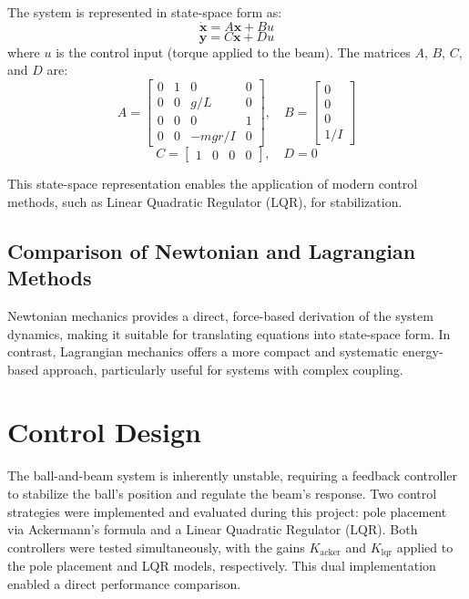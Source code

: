 \documentclass[conference]{IEEEtran}
\begin{document}
The system is represented in state-space form as:
\begin{equation}
\dot{\mathbf{x}} = A \mathbf{x} + B u
\end{equation}
\begin{equation}
\mathbf{y} = C \mathbf{x} + D u
\end{equation}
where \(u\) is the control input (torque applied to the beam). The matrices \(A\), \(B\), \(C\), and \(D\) are:
\[
A = \begin{bmatrix}
0 & 1 & 0 & 0 \\
0 & 0 & g/L & 0 \\
0 & 0 & 0 & 1 \\
0 & 0 & -m g r/I & 0
\end{bmatrix}, \quad
B = \begin{bmatrix}
0 \\ 0 \\ 0 \\ 1/I
\end{bmatrix}
\]
\[
C = \begin{bmatrix}
1 & 0 & 0 & 0
\end{bmatrix}, \quad
D = 0
\]

This state-space representation enables the application of modern control methods, such as Linear Quadratic Regulator (LQR), for stabilization.

\subsection{Comparison of Newtonian and Lagrangian Methods}
\label{subsec:model_comparison}
Newtonian mechanics provides a direct, force-based derivation of the system dynamics, making it suitable for translating equations into state-space form. In contrast, Lagrangian mechanics offers a more compact and systematic energy-based approach, particularly useful for systems with complex coupling.

\section{Control Design}
\label{sec:control_design}
The ball-and-beam system is inherently unstable, requiring a feedback controller to stabilize the ball's position and regulate the beam's response. Two control strategies were implemented and evaluated during this project: pole placement via Ackermann's formula and a Linear Quadratic Regulator (LQR). Both controllers were tested simultaneously, with the gains \(K_{\text{acker}}\) and \(K_{\text{lqr}}\) applied to the pole placement and LQR models, respectively. This dual implementation enabled a direct performance comparison.
\end{document}
